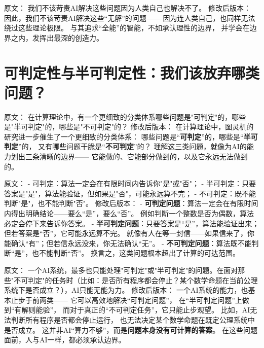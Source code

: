 原文：
我们不该苛责AI解决这些问题因为人类自己也解决不了。
修改后版本：
因此，我们不该苛责AI解决这些“无解”的问题——  
因为连人类自己，也同样无法绕过这些理论极限。  
与其追求“全能”的智能，不如承认理性的边界，  
并学会在边界之内，发挥出最深的创造力。


\section*{可判定性与半可判定性：我们该放弃哪类问题？}

原文：
在计算理论中，有一个更细致的分类体系哪些问题是"可判定"的，哪些是"半可判定"的，哪些是"不可判定"的？
修改后版本：
在计算理论中，图灵机的研究进一步催生了一个更细致的分类体系：  
哪些问题是“\textbf{可判定}”的，哪些是“\textbf{半可判定}”的，  
又有哪些问题干脆是“\textbf{不可判定}”的？  
理解这三类问题，就像为AI的能力划出三条清晰的边界——  
它能做的、它能部分做到的，以及它永远无法做到的。



原文：
- 可判定：算法一定会在有限时间内告诉你"是"或"否"；
- 半可判定：只要答案是"是"，算法能验证，但如果是"否"，可能永远算不完；
- 不可判定：既不能判断"是"，也不能判断"否"。
修改后版本：
- \textbf{可判定问题}：算法一定会在有限时间内得出明确结论——要么“是”，要么“否”。  
  例如判断一个整数是否为偶数，算法必定会停下来告诉你答案。  
- \textbf{半可判定问题}：只要答案是“是”，算法能验证出来；但若答案是“否”，它可能永远算不完。  
  就像有人在等一封信——如果信来了，你能确认“有”；但若信永远没来，你无法确认“无”。  
- \textbf{不可判定问题}：算法既不能判断“是”，也不能判断“否”。  
  换言之，这类问题根本超出了计算的可达范围。



原文：
一个AI系统，最多也只能处理"可判定"或"半可判定"的问题。在面对那些"不可判定"的任务时（比如：是否所有程序都会停止？某个数学命题在当前公理系统下是否成立？），AI只能无能为力。
修改后版本：
一个AI系统的能力，也基本止步于前两类——  
它可以高效地解决“可判定问题”，  
在“半可判定问题”上做到“有解则能验”，  
而对于真正的“不可判定任务”，它只能止步观望。  
比如，AI无法判断所有程序是否都会停止运行，  
也无法决定某个数学命题在既定公理系统中是否成立。  
这并非AI“算力不够”，而是\textbf{问题本身没有可计算的答案}。  
在这些问题面前，人与AI一样，都必须承认边界。



